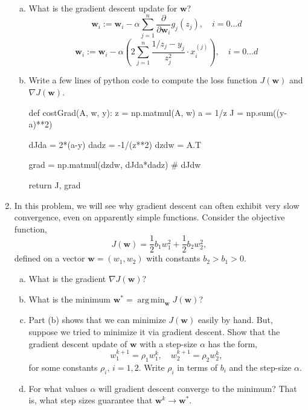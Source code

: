 \documentclass[11pt]{article}
\def\argmin{\mathop{\mathrm{arg\,min}}}
\def\arr{\rightarrow}
\newcommand{\wbf}{\mathbf{w}}
\newcommand{\Abf}{\mathbf{A}}
\begin{document}
\begin{enumerate}
\begin{enumerate}[(a)]
\item What is the gradient descent update for $\wbf$?
\[
	\wbf_i := \wbf_i - \alpha \sum_{j=1}^n \frac{\partial}{\partial \wbf_i} g_j(z_j) ,\quad i=0...d
\]
\[
	\wbf_i := \wbf_i - \alpha \left( 2 \sum_{j=1}^n \frac{1/z_j - y_j}{z_j^2} \cdot x^{(j)}_i \right) , \quad i=0...d
\]
\item Write a few lines of python code to compute the loss function $J(\wbf)$ and
$\nabla J(\wbf)$.

	
	
	

\begin{python}
def costGrad(A, w, y):
    z = np.matmul(A, w)
    a = 1/z
    J = np.sum((y-a)**2)
    
    dJda = 2*(a-y)
    dadz = -1/(z**2)
    dzdw = A.T
    
    grad = np.matmul(dzdw, dJda*dadz) # dJdw
    
    return J, grad
\end{python}

\end{enumerate}

\item In this problem, we will see why gradient descent can often exhibit
very slow convergence, even on apparently simple functions.
Consider the objective function,
\[
    J(\wbf) = \frac{1}{2}b_1w_1^2 + \frac{1}{2}b_2w_2^2,
\]
defined on a vector $\wbf=(w_1,w_2)$ with constants $b_2 > b_1 > 0$.
\begin{enumerate}[(a)]
  \item What is the gradient $\nabla J(\wbf)$?
  \item What is the minimum $\wbf^* = \argmin_{\wbf} J(\wbf)$?
  \item Part (b) shows that we can minimize $J(\wbf)$ easily by hand.
  But, suppose we tried to minimize it via gradient descent.
  Show that the gradient descent update of $\wbf$ with a step-size $\alpha$
has the form,
\[
    w_1^{k+1} = \rho_1 w_1^k, \quad w_2^{k+1} = \rho_2 w_2^k,
\]
for some constants $\rho_i$, $i=1,2$.  Write $\rho_i$ in terms of
$b_i$ and the step-size $\alpha$.
  \item For what values $\alpha$ will gradient descent converge to the minimum? That is, what step sizes guarantee that $\wbf^k \arr \wbf^*$.


\end{enumerate}
\end{enumerate}
\end{document}

